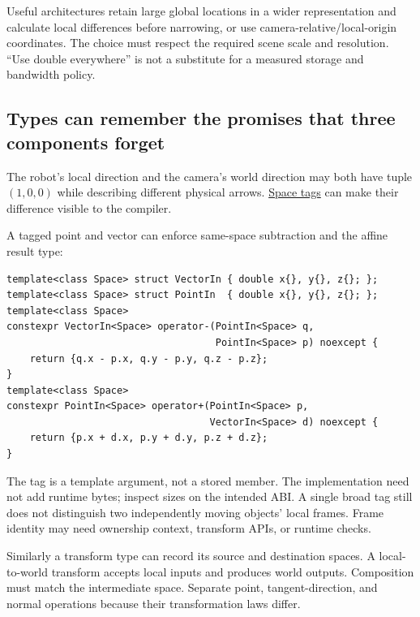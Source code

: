 Useful architectures retain large global locations in a wider representation and calculate local differences before narrowing, or use camera-relative/local-origin coordinates. The choice must respect the required scene scale and resolution. ``Use double everywhere'' is not a substitute for a measured storage and bandwidth policy.

\subsection{Types can remember the promises that three components forget}\label{02-foundations-ii-ch037-types-can-remember-the-promises-that-three-components-forget}

\hypertarget{02-foundations-ii-ch037-types-can-remember-the-promises-that-three-components-forget}{}

The robot's local direction and the camera's world direction may both have tuple \((1,0,0)\) while describing different physical arrows. \hyperref[02-foundations-ii-ch037-types-can-remember-the-promises-that-three-components-forget]{Space tags} can make their difference visible to the compiler.

A tagged point and vector can enforce same-space subtraction and the affine result type:

\begin{verbatim}
template<class Space> struct VectorIn { double x{}, y{}, z{}; };
template<class Space> struct PointIn  { double x{}, y{}, z{}; };
template<class Space>
constexpr VectorIn<Space> operator-(PointIn<Space> q,
                                    PointIn<Space> p) noexcept {
    return {q.x - p.x, q.y - p.y, q.z - p.z};
}
template<class Space>
constexpr PointIn<Space> operator+(PointIn<Space> p,
                                   VectorIn<Space> d) noexcept {
    return {p.x + d.x, p.y + d.y, p.z + d.z};
}
\end{verbatim}

The tag is a template argument, not a stored member. The implementation need not add runtime bytes; inspect sizes on the intended ABI. A single broad  tag still does not distinguish two independently moving objects' local frames. Frame identity may need ownership context, transform APIs, or runtime checks.

Similarly a transform type can record its source and destination spaces. A local-to-world transform accepts local inputs and produces world outputs. Composition must match the intermediate space. Separate point, tangent-direction, and normal operations because their transformation laws differ.

